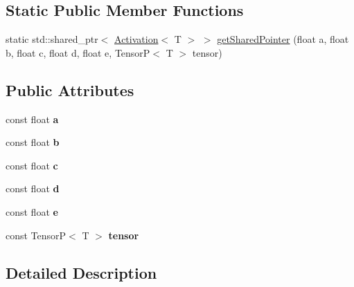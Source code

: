 \subsection*{Static Public Member Functions}
\begin{DoxyCompactItemize}
\item 
static std\+::shared\+\_\+ptr$<$ \hyperlink{classActivation}{Activation}$<$ T $>$ $>$ \hyperlink{classPolynomialActivationDegree4_a346ca80a2c23ef036d6a76297f1ce3c1}{get\+Shared\+Pointer} (float a, float b, float c, float d, float e, TensorP$<$ T $>$ tensor)
\end{DoxyCompactItemize}
\subsection*{Public Attributes}
\begin{DoxyCompactItemize}
\item 
\mbox{\label{classPolynomialActivationDegree4_ac83373180a1f333474f807ca37d44754}} 
const float {\bfseries a}
\item 
\mbox{\label{classPolynomialActivationDegree4_a003982278a23dca6e84edcd657e0ed35}} 
const float {\bfseries b}
\item 
\mbox{\label{classPolynomialActivationDegree4_aaba71013d2ad6a6a7d9e32e204a53201}} 
const float {\bfseries c}
\item 
\mbox{\label{classPolynomialActivationDegree4_ac562373568ad12006ef1251f982b3668}} 
const float {\bfseries d}
\item 
\mbox{\label{classPolynomialActivationDegree4_a10335c8b30c3f19d82b5d468ec5f9adb}} 
const float {\bfseries e}
\item 
\mbox{\label{classPolynomialActivationDegree4_a29bc9fadb52a7d784de6d1718d31449b}} 
const TensorP$<$ T $>$ {\bfseries tensor}
\end{DoxyCompactItemize}


\subsection{Detailed Description}
